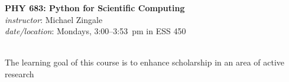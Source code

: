 \documentclass[11pt]{article}
\begin{document}
\begin{center}
{\Large \bf PHY 683: Python for Scientific Computing} \\[0.25em]
{\em instructor}\/: Michael Zingale \\
{\em date/location}\/: Mondays, 3:00--3:53~pm in ESS 450
\end{center}

 \\
The learning goal of this course is to enhance scholarship in an area
of active research

\ \\
 \\

\ \\
 \\

\ \\
 \\
\end{document}
